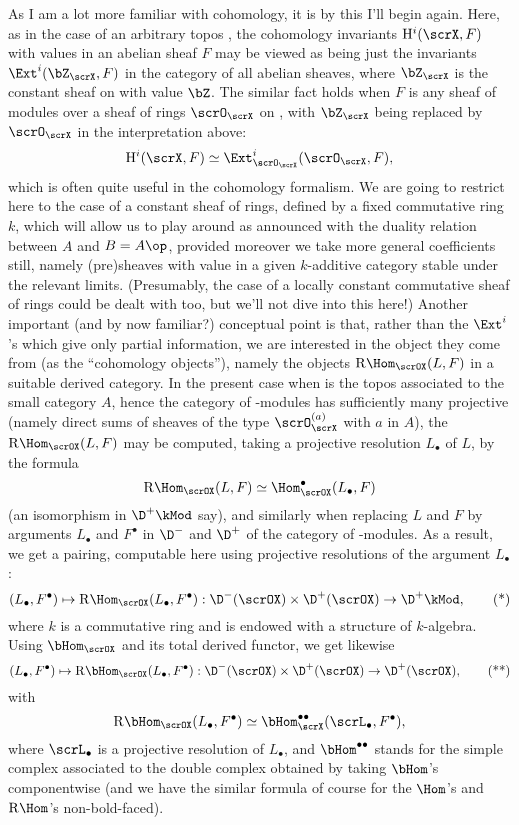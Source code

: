 As I am a lot more familiar with cohomology, it is by this I'll begin
again. Here, as in the case of an arbitrary topos \scrX, the
cohomology invariants $\mathrm H^i(\scrX,F)$ with values in an abelian
sheaf $F$ may be viewed as being just the invariants
$\Ext^i(\bZ_\scrX,F)$ in the category of all abelian sheaves, where
$\bZ_\scrX$ is the constant sheaf on \scrX{} with value $\bZ$. The
similar fact holds when $F$ is any sheaf of modules over a sheaf of
rings $\scrO_\scrX$ on \scrX, with $\bZ_\scrX$ being replaced by
$\scrO_\scrX$ in the interpretation above:
\[\mathrm H^i(\scrX,F) \simeq \Ext^i_{\scrO_\scrX}(\scrO_\scrX, F),\]
which is often quite useful in the cohomology formalism. We are going
to restrict here to the case of a constant sheaf of rings, defined by
a fixed commutative ring $k$, which will allow us to play around as
announced with the duality relation between $A$ and $B=A\op$, provided
moreover we take more general coefficients still, namely (pre)sheaves
with value in a given $k$-additive category \scrM{} stable under the
relevant limits. (Presumably, the case of a locally constant
commutative sheaf of rings could be dealt with too, but we'll not dive
into this here!) Another important (and by now familiar?) conceptual
point is that, rather than the $\Ext^i$'s which give only partial
information, we are interested in the object they come from (as the
``cohomology objects''), namely the objects $\mathrm
R\Hom_\scrOX(L,F)$ in a suitable derived category. In the present
case when \scrX{} is the topos associated to the small category $A$,
hence the category of \scrOX-modules has sufficiently many projective
(namely direct sums of sheaves of the type $\scrO_\scrX^{(a)}$ with
$a$ in $A$), the $\mathrm R\Hom_\scrOX(L,F)$ may be computed, taking a
projective resolution $L_\bullet$ of $L$, by the formula
\[\mathrm R\Hom_\scrOX(L,F) \simeq \Hom_\scrOX^\bullet(L_\bullet,F)\]
(an isomorphism in $\D^+\kMod$ say), and similarly when replacing $L$
and $F$ by arguments $L_\bullet$ and $F^\bullet$ in $\D^-$ and $\D^+$
of the category of \scrOX-modules. As a result, we get a pairing,
computable here using projective resolutions of the argument
$L_\bullet$:
\begin{equation}
  \label{eq:108.star}
  (L_\bullet,F^\bullet)\mapsto\mathrm
  R\Hom_\scrOX(L_\bullet,F^\bullet) : \D^-(\scrOX)\times\D^+(\scrOX)
  \to \D^+\kMod,\tag{*}
\end{equation}
where $k$ is a commutative ring and \scrOX{} is endowed with a
structure of $k$-algebra. Using $\bHom_\scrOX$ and its total derived
functor, we get likewise
\begin{equation}
  \label{eq:108.starstar}
  (L_\bullet,F^\bullet)\mapsto\mathrm
  R\bHom_\scrOX(L_\bullet,F^\bullet) : \D^-(\scrOX)\times\D^+(\scrOX)
  \to \D^+(\scrOX),\tag{**}
\end{equation}
with
\[\mathrm R\bHom_\scrOX(L_\bullet,F^\bullet) \simeq
\bHom_\scrX^{\bullet\bullet}(\scrL_\bullet,F^\bullet),\]
where $\scrL_\bullet$ is a projective resolution of $L_\bullet$, and
$\bHom^{\bullet\bullet}$ stands for the simple complex associated to
the double complex obtained by taking $\bHom$'s
componentwise (and we have the similar formula of course for the
$\Hom$'s and $\mathrm R\Hom$'s non-bold-faced).


